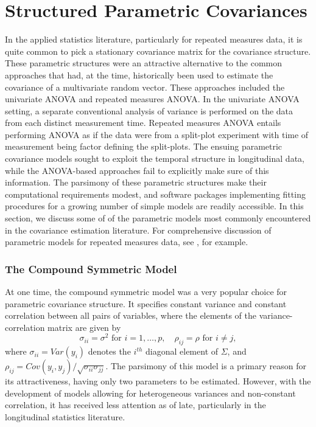 \section{Structured Parametric Covariances} \label{chapter-1-parametric-covariance-models}


In the applied statistics literature, particularly for repeated measures data, it is quite common to pick a stationary covariance matrix for the covariance structure. These parametric structures were an attractive alternative to the common approaches that had, at the time, historically been used to estimate the covariance of a multivariate random vector. These approaches included the univariate ANOVA and repeated measures ANOVA. In the univariate ANOVA setting, a separate conventional analysis of variance is performed on the data from each distinct measurement time. Repeated measures ANOVA entails performing ANOVA as if the data were from a split-plot experiment with time of measurement being factor defining the split-plots.  The ensuing parametric covariance models sought to exploit the temporal structure in longitudinal data, while the ANOVA-based approaches fail to explicitly make sure of this information. The parsimony of these parametric structures make their computational requirements modest, and software packages implementing fitting procedures for a growing number of simple models are readily accessible. In this section, we discuss some of of the parametric models most commonly encountered in the covariance estimation literature. For comprehensive discussion of parametric models for repeated measures data, see \cite{jennrich1986unbalanced}, for example. 

\subsubsection{The Compound Symmetric Model}

At one time, the compound symmetric model was a very popular choice for parametric covariance structure. It specifies constant variance and constant correlation between all pairs of variables, where the elements of the variance-correlation matrix are given by
\begin{equation}\label{eq:compound-symmetric-model}
\sigma_{ii}  = \sigma^2 \mbox { for }i = 1,\dots, p, \quad \rho_{ij} = \rho \mbox{ for } i \ne j,
\end{equation}
\noindent
where $\sigma_{ii} = Var\left(y_i\right)$ denotes the $i^{th}$ diagonal element of $\Sigma$, and $\rho_{ij} = Cov\left(y_i, y_j\right)/\sqrt{\sigma_{ii}\sigma_{jj}}$. The parsimony of this model is a primary reason for its attractiveness, having only two parameters to be estimated. However, with the development of models allowing for heterogeneous variances and non-constant correlation, it has received less attention as of late, particularly in the longitudinal statistics literature. 

